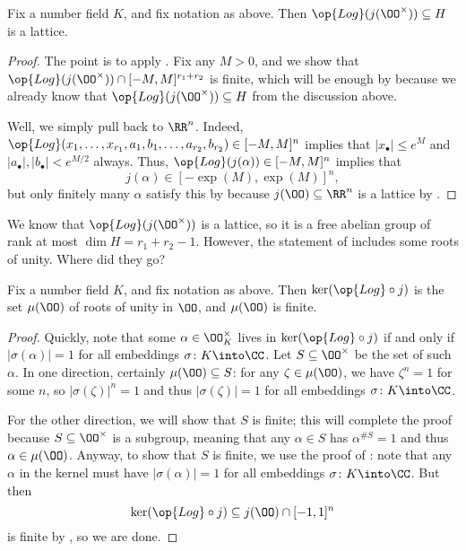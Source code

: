 \documentclass[../notes.tex]{subfiles}
\begin{document}
\begin{proposition} \label{prop:log-j-o-is-lattice}
	Fix a number field $K$, and fix notation as above. Then $\op{Log}(j(\OO^\times))\subseteq H$ is a lattice.
\end{proposition}
\begin{proof}
	The point is to apply . Fix any $M>0$, and we show that $\op{Log}(j(\OO^\times))\cap[-M,M]^{r_1+r_2}$ is finite, which will be enough by  because we already know that $\op{Log}(j(\OO^\times))\subseteq H$ from the discussion above.

	Well, we simply pull back to $\RR^n$. Indeed, $\op{Log}(x_1,\ldots,x_{r_1},a_1,b_1,\ldots,a_{r_2},b_{r_2})\in[-M,M]^n$ implies that $\left|x_\bullet\right|\le e^M$ and $\left|a_\bullet\right|,\left|b_\bullet\right|<e^{M/2}$ always. Thus, $\op{Log}(j(\alpha))\in[-M,M]^n$ implies that
	\[j(\alpha)\in[-\exp(M),\exp(M)]^n,\]
	but only finitely many $\alpha$ satisfy this by  because $j(\OO)\subseteq\RR^n$ is a lattice by .
\end{proof}
We know that $\op{Log}(j(\OO^\times))$ is a lattice, so it is a free abelian group of rank at most $\dim H=r_1+r_2-1$. However, the statement of  includes some roots of unity. Where did they go?
\begin{lemma} \label{lem:ker-log-is-mu-k}
	Fix a number field $K$, and fix notation as above. Then $\ker({\op{Log}}\circ j)$ is the set $\mu(\OO)$ of roots of unity in $\OO$, and $\mu(\OO)$ is finite.
\end{lemma}
\begin{proof}
	Quickly, note that some $\alpha\in\OO_K^\times$ lives in $\ker({\op{Log}}\circ j)$ if and only if $\left|\sigma(\alpha)\right|=1$ for all embeddings $\sigma\colon K\into\CC$. Let $S\subseteq\OO^\times$ be the set of such $\alpha$. In one direction, certainly $\mu(\OO)\subseteq S$: for any $\zeta\in\mu(\OO)$, we have $\zeta^n=1$ for some $n$, so $\left|\sigma(\zeta)\right|^n=1$ and thus $\left|\sigma(\zeta)\right|=1$ for all embeddings $\sigma\colon K\into\CC$.

	For the other direction, we will show that $S$ is finite; this will complete the proof because $S\subseteq\OO^\times$ is a subgroup, meaning that any $\alpha\in S$ has $\alpha^{\#S}=1$ and thus $\alpha\in\mu(\OO)$. Anyway, to show that $S$ is finite, we use the proof of : note that any $\alpha$ in the kernel must have $\left|\sigma(\alpha)\right|=1$ for all embeddings $\sigma\colon K\into\CC$. But then
	\[\ker({\op{Log}}\circ j)\subseteq j(\OO)\cap[-1,1]^n\]
	is finite by , so we are done.
\end{proof}
\end{document}
